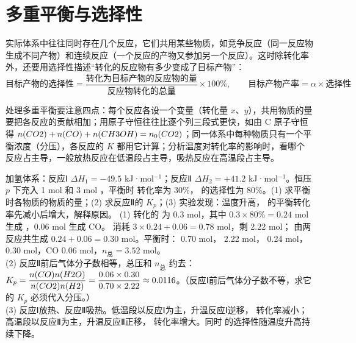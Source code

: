 \section{多重平衡与选择性}

实际体系中往往同时存在几个反应，它们共用某些物质，如竞争反应（同一反应物生成不同产物）和连续反应（一个反应的产物又参加另一个反应）。这时除转化率外，还要用选择性描述“转化的反应物有多少变成了目标产物”：
\[\text{目标产物的选择性}=\frac{\text{转化为目标产物的反应物的量}}{\text{反应物转化的总量}}\times100\%,\qquad \text{目标产物产率}=\alpha\times\text{选择性}\]

处理多重平衡要注意四点：每个反应各设一个变量（转化量 $x$、$y$），共用物质的量要把各反应的贡献相加；用原子守恒往往比逐个列三段式更快，如由 C 原子守恒得 $n(CO2)+n(CO)+n(CH3OH)=n_0(CO2)$；同一体系中每种物质只有一个平衡浓度（分压），各反应的 $K$ 都用它计算；分析温度对转化率的影响时，看哪个反应占主导，一般放热反应在低温段占主导，吸热反应在高温段占主导。

\begin{liti}[多重平衡的计算]
 加氢体系：反应Ⅰ  $\Delta H_1=-49.5$ kJ·mol$^{-1}$；反应Ⅱ  $\Delta H_2=+41.2$ kJ·mol$^{-1}$。恒压 $p$ 下充入 1 mol  和 3 mol ，平衡时  转化率为 30\%， 的选择性为 80\%。(1) 求平衡时各物质的物质的量；(2) 求反应Ⅱ的 $K_p$；(3) 实验发现：温度升高， 的平衡转化率先减小后增大，解释原因。
\tcblower
\jie (1) 转化的  为 0.3 mol，其中 $0.3\times80\%=0.24$ mol 生成 ，0.06 mol 生成 CO。 消耗 $3\times0.24+0.06=0.78$ mol，剩 2.22 mol； 由两反应共生成 $0.24+0.06=0.30$ mol。平衡时： 0.70 mol， 2.22 mol， 0.24 mol， 0.30 mol，CO 0.06 mol，$n_\text{总}=3.52$ mol。\\
(2) 反应Ⅱ前后气体分子数相等，总压和 $n_\text{总}$ 约去：$K_p=\dfrac{n(CO)n(H2O)}{n(CO2)n(H2)}=\dfrac{0.06\times0.30}{0.70\times2.22}\approx0.0116$。（反应Ⅰ前后气体分子数不等，求它的 $K_p$ 必须代入分压。）\\
(3) 反应Ⅰ放热、反应Ⅱ吸热。低温段以反应Ⅰ为主，升温反应Ⅰ逆移， 转化率减小；高温段以反应Ⅱ为主，升温反应Ⅱ正移， 转化率增大。同时  的选择性随温度升高持续下降。
\end{liti}


